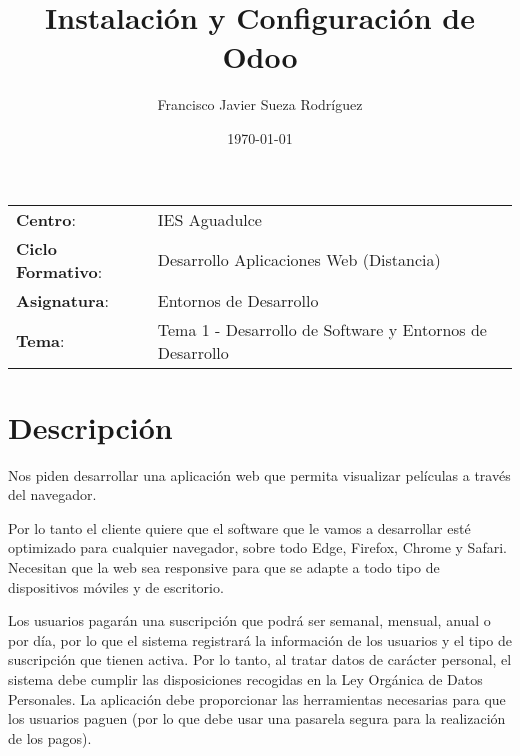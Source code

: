 


\title{
\normalfont \normalsize
\huge \textbf{Instalación y Configuración de Odoo}
}
\author{Francisco Javier Sueza Rodríguez}
\date{\normalsize\today}



\maketitle

\vspace{2ex}

\begin{center}
    \begin{tabular}{l l}
        \textbf{Centro}: & IES Aguadulce \\
        \textbf{Ciclo Formativo}: & Desarrollo Aplicaciones Web (Distancia)\\
        \textbf{Asignatura}: & Entornos de Desarrollo\\
        \textbf{Tema}: & Tema 1 - Desarrollo de Software y Entornos de Desarrollo \\
    \end{tabular}
\end{center}

\vspace{10ex}

\section{Descripción}
Nos piden desarrollar una aplicación web que permita visualizar películas a través del navegador.

Por lo tanto el cliente quiere que el software que le vamos a desarrollar esté optimizado para cualquier navegador, sobre todo Edge, Firefox, Chrome y Safari. Necesitan que la web sea responsive para que se adapte a todo tipo de dispositivos móviles y de escritorio.

Los usuarios pagarán una suscripción que podrá ser semanal, mensual, anual o por día, por lo que el sistema registrará la información de los usuarios y el tipo de suscripción que tienen activa. Por lo tanto, al tratar datos de carácter personal, el sistema debe cumplir las disposiciones recogidas en la Ley Orgánica de Datos Personales. La aplicación debe proporcionar las herramientas necesarias para que los usuarios paguen (por lo que debe usar una pasarela segura para la realización de los pagos).

